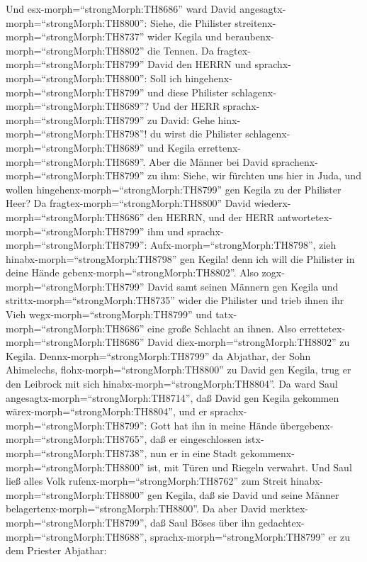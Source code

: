  Und esx-morph=``strongMorph:TH8686'' ward David
angesagtx-morph=``strongMorph:TH8800'': Siehe, die Philister
streitenx-morph=``strongMorph:TH8737'' wider Kegila und
beraubenx-morph=``strongMorph:TH8802'' die Tennen.  Da
fragtex-morph=``strongMorph:TH8799'' David den HERRN und
sprachx-morph=``strongMorph:TH8800'': Soll ich
hingehenx-morph=``strongMorph:TH8799'' und diese Philister
schlagenx-morph=``strongMorph:TH8689''? Und der HERR
sprachx-morph=``strongMorph:TH8799'' zu David: Gehe
hinx-morph=``strongMorph:TH8798''! du wirst die Philister
schlagenx-morph=``strongMorph:TH8689'' und Kegila
errettenx-morph=``strongMorph:TH8689''.  Aber die Männer bei
David sprachenx-morph=``strongMorph:TH8799'' zu ihm: Siehe, wir fürchten
uns hier in Juda, und wollen hingehenx-morph=``strongMorph:TH8799'' gen
Kegila zu der Philister Heer?  Da
fragtex-morph=``strongMorph:TH8800'' David
wiederx-morph=``strongMorph:TH8686'' den HERRN, und der HERR
antwortetex-morph=``strongMorph:TH8799'' ihm und
sprachx-morph=``strongMorph:TH8799'': Aufx-morph=``strongMorph:TH8798'',
zieh hinabx-morph=``strongMorph:TH8798'' gen Kegila! denn ich will die
Philister in deine Hände gebenx-morph=``strongMorph:TH8802''.
 Also zogx-morph=``strongMorph:TH8799'' David samt seinen
Männern gen Kegila und strittx-morph=``strongMorph:TH8735'' wider die
Philister und trieb ihnen ihr Vieh wegx-morph=``strongMorph:TH8799'' und
tatx-morph=``strongMorph:TH8686'' eine große Schlacht an ihnen. Also
errettetex-morph=``strongMorph:TH8686'' David
diex-morph=``strongMorph:TH8802'' zu Kegila. 
Dennx-morph=``strongMorph:TH8799'' da Abjathar, der Sohn Ahimelechs,
flohx-morph=``strongMorph:TH8800'' zu David gen Kegila, trug er den
Leibrock mit sich hinabx-morph=``strongMorph:TH8804''.  Da
ward Saul angesagtx-morph=``strongMorph:TH8714'', daß David gen Kegila
gekommen wärex-morph=``strongMorph:TH8804'', und er
sprachx-morph=``strongMorph:TH8799'': Gott hat ihn in meine Hände
übergebenx-morph=``strongMorph:TH8765'', daß er eingeschlossen
istx-morph=``strongMorph:TH8738'', nun er in eine Stadt
gekommenx-morph=``strongMorph:TH8800'' ist, mit Türen und Riegeln
verwahrt.  Und Saul ließ alles Volk
rufenx-morph=``strongMorph:TH8762'' zum Streit
hinabx-morph=``strongMorph:TH8800'' gen Kegila, daß sie David und seine
Männer belagertenx-morph=``strongMorph:TH8800''.  Da aber
David merktex-morph=``strongMorph:TH8799'', daß Saul Böses über ihn
gedachtex-morph=``strongMorph:TH8688'',
sprachx-morph=``strongMorph:TH8799'' er zu dem Priester Abjathar:
